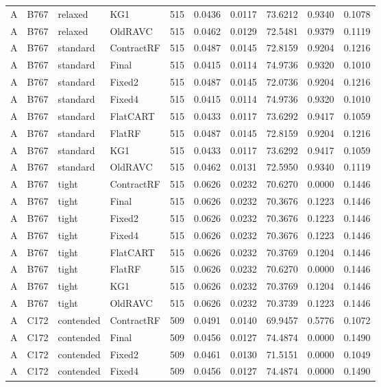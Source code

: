 \begin{longtable}{@{}llllllllll@{}}
A & B767 & relaxed & KG1 & 515 & 0.0436 & 0.0117 & 73.6212 & 0.9340 & 0.1078\\
A & B767 & relaxed & OldRAVC & 515 & 0.0462 & 0.0129 & 72.5481 & 0.9379 & 0.1119\\
A & B767 & standard & ContractRF & 515 & 0.0487 & 0.0145 & 72.8159 & 0.9204 & 0.1216\\
A & B767 & standard & Final & 515 & 0.0415 & 0.0114 & 74.9736 & 0.9320 & 0.1010\\
A & B767 & standard & Fixed2 & 515 & 0.0487 & 0.0145 & 72.0736 & 0.9204 & 0.1216\\
A & B767 & standard & Fixed4 & 515 & 0.0415 & 0.0114 & 74.9736 & 0.9320 & 0.1010\\
A & B767 & standard & FlatCART & 515 & 0.0433 & 0.0117 & 73.6292 & 0.9417 & 0.1059\\
A & B767 & standard & FlatRF & 515 & 0.0487 & 0.0145 & 72.8159 & 0.9204 & 0.1216\\
A & B767 & standard & KG1 & 515 & 0.0433 & 0.0117 & 73.6292 & 0.9417 & 0.1059\\
A & B767 & standard & OldRAVC & 515 & 0.0462 & 0.0131 & 72.5950 & 0.9340 & 0.1119\\
A & B767 & tight & ContractRF & 515 & 0.0626 & 0.0232 & 70.6270 & 0.0000 & 0.1446\\
A & B767 & tight & Final & 515 & 0.0626 & 0.0232 & 70.3676 & 0.1223 & 0.1446\\
A & B767 & tight & Fixed2 & 515 & 0.0626 & 0.0232 & 70.3676 & 0.1223 & 0.1446\\
A & B767 & tight & Fixed4 & 515 & 0.0626 & 0.0232 & 70.3676 & 0.1223 & 0.1446\\
A & B767 & tight & FlatCART & 515 & 0.0626 & 0.0232 & 70.3769 & 0.1204 & 0.1446\\
A & B767 & tight & FlatRF & 515 & 0.0626 & 0.0232 & 70.6270 & 0.0000 & 0.1446\\
A & B767 & tight & KG1 & 515 & 0.0626 & 0.0232 & 70.3769 & 0.1204 & 0.1446\\
A & B767 & tight & OldRAVC & 515 & 0.0626 & 0.0232 & 70.3739 & 0.1223 & 0.1446\\
A & C172 & contended & ContractRF & 509 & 0.0491 & 0.0140 & 69.9457 & 0.5776 & 0.1072\\
A & C172 & contended & Final & 509 & 0.0456 & 0.0127 & 74.4874 & 0.0000 & 0.1490\\
A & C172 & contended & Fixed2 & 509 & 0.0461 & 0.0130 & 71.5151 & 0.0000 & 0.1049\\
A & C172 & contended & Fixed4 & 509 & 0.0456 & 0.0127 & 74.4874 & 0.0000 & 0.1490\\

\end{longtable}
